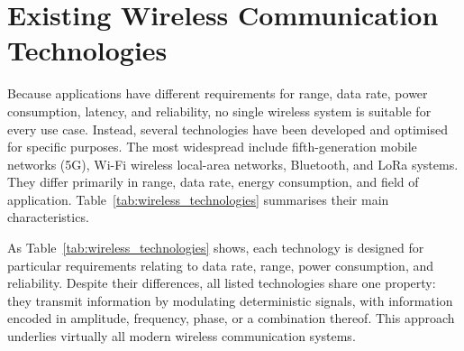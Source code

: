 \documentclass[a4paper, 12pt, openany]{book}
\begin{document}
\section{Existing Wireless Communication Technologies}

Because applications have different requirements for range, data rate, power consumption, latency, and reliability, no single wireless system is suitable for every use case. Instead, several technologies have been developed and optimised for specific purposes. The most widespread include fifth-generation mobile networks (5G), Wi-Fi wireless local-area networks, Bluetooth, and LoRa systems. They differ primarily in range, data rate, energy consumption, and field of application. Table~\ref{tab:wireless_technologies} summarises their main characteristics.

\begin{table}[H]
\renewcommand{\arraystretch}{1.3}
\caption{Comparison of commonly used wireless communication technologies.}
\label{tab:wireless_technologies}
\end{table}

As Table~\ref{tab:wireless_technologies} shows, each technology is designed for particular requirements relating to data rate, range, power consumption, and reliability. Despite their differences, all listed technologies share one property: they transmit information by modulating deterministic signals, with information encoded in amplitude, frequency, phase, or a combination thereof. This approach underlies virtually all modern wireless communication systems.
\end{document}
